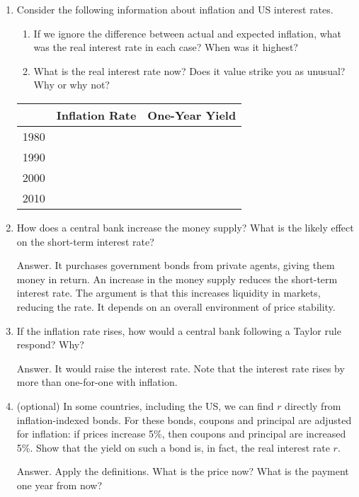 \documentclass[letterpaper,12pt]{article}
\begin{document}
\begin{enumerate}
\item Consider the following information about inflation and US interest rates.
\begin{enumerate}
\item If we ignore the difference between actual and expected inflation,
what was the real interest rate in each case?
When was it highest?
\item What is the real interest rate now?
Does it value strike you as unusual?  Why or why not?
\end{enumerate}

\begin{center}
\begin{tabular}{lrr}
\toprule
        & Inflation Rate & One-Year Yield \\
\midrule
1980 \hspace*{0.25in}      & \\
1990    \\
2000    \\
2010    \\
\bottomrule
\end{tabular}
\end{center}

\item How does a central bank increase the money supply?
What is the likely effect on the short-term interest rate?

Answer.
It purchases government bonds from private agents,
giving them money in return.
An increase in the money supply reduces the short-term
interest rate.
The argument is that this increases liquidity in markets, reducing
the rate.
It depends on an overall environment of price stability.

\item If the inflation rate rises,
how would a central bank following a Taylor rule respond?
Why?

Answer.  It would raise the interest rate.
Note that the interest rate rises by more than one-for-one
with inflation.

\item (optional) In some countries, including the US,
we can find $r$ directly from inflation-indexed
bonds.  For these bonds, coupons and
principal are adjusted for inflation:
if prices increase 5\%, then coupons
and principal are increased 5\%.
Show that the yield on such a bond is, in fact,
the real interest rate $r$.

Answer.  Apply the definitions.  What is the price now?
What is the payment one year from now?


\end{enumerate}
\end{document}
